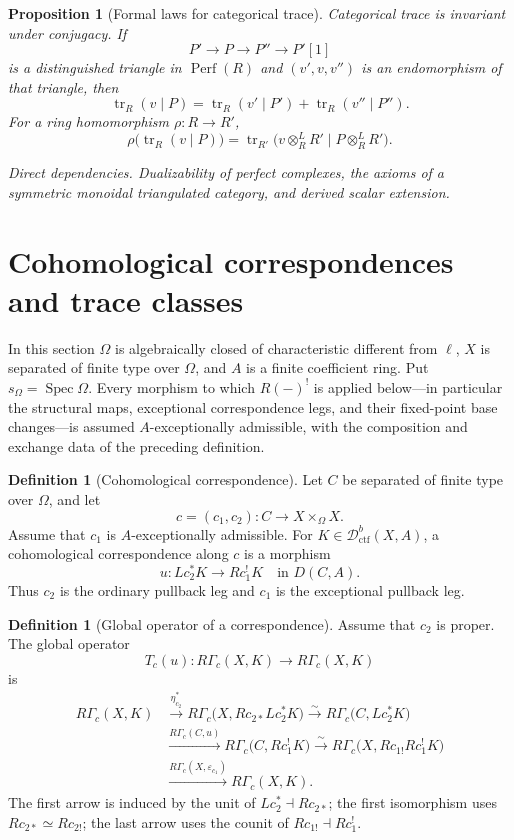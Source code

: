 \documentclass[10pt]{article}
\newtheorem{proposition}[theorem]{Proposition}
\theoremstyle{definition}
\newtheorem{definition}[theorem]{Definition}
\newcommand{\Dctf}{\mathcal D^b_{\mathrm{ctf}}}
\newcommand{\Perf}{\operatorname{Perf}}
\newcommand{\Spec}{\operatorname{Spec}}
\newcommand{\RGammac}{R\Gamma_c}
\newcommand{\depends}[1]{\par\smallskip\noindent\textit{Direct dependencies.} #1\par}
\begin{document}
\begin{proposition}[Formal laws for categorical trace]
Categorical trace is invariant under conjugacy.  If
\[
 P'\to P\to P''\to P'[1]
\]
is a distinguished triangle in \(\Perf(R)\) and
\((v',v,v'')\) is an endomorphism of that triangle, then
\[
 \operatorname{tr}_R(v\mid P)=
 \operatorname{tr}_R(v'\mid P')+
 \operatorname{tr}_R(v''\mid P'').
\]
For a ring homomorphism \(\rho:R\to R'\),
\[
 \rho\bigl(\operatorname{tr}_R(v\mid P)\bigr)=
 \operatorname{tr}_{R'}
 \bigl(v\otimes_R^LR'\mid P\otimes_R^LR'\bigr).
\]
\depends{Dualizability of perfect complexes, the axioms of a symmetric
monoidal triangulated category, and derived scalar extension.}
\end{proposition}

\section{Cohomological correspondences and trace classes}

In this section \(\Omega\) is algebraically closed of characteristic
different from \(\ell\), \(X\) is separated of finite type over
\(\Omega\), and \(A\) is a finite coefficient ring.  Put
\(s_\Omega=\Spec\Omega\).  Every morphism to which \(R(-)^!\) is applied
below---in particular the structural maps, exceptional correspondence legs,
and their fixed-point base changes---is assumed \(A\)-exceptionally
admissible, with the composition and exchange data of the preceding
definition.

\begin{definition}[Cohomological correspondence]
Let \(C\) be separated of finite type over \(\Omega\), and let
\[
 c=(c_1,c_2):C\longrightarrow X\times_\Omega X.
\]
Assume that \(c_1\) is \(A\)-exceptionally admissible.
For \(K\in\Dctf(X,A)\), a cohomological correspondence along \(c\) is a
morphism
\[
 u:Lc_2^*K\longrightarrow Rc_1^!K
 \quad\text{in }D(C,A).
\]
Thus \(c_2\) is the ordinary pullback leg and \(c_1\) is the exceptional
pullback leg.
\end{definition}

\begin{definition}[Global operator of a correspondence]
Assume that \(c_2\) is proper.  The global operator
\[
 T_c(u):\RGammac(X,K)\longrightarrow\RGammac(X,K)
\]
is
\[
\begin{aligned}
\RGammac(X,K)
&\xrightarrow{\eta^*_{c_2}}
\RGammac\bigl(X,Rc_{2*}Lc_2^*K\bigr)
\xrightarrow{\sim}\RGammac\bigl(C,Lc_2^*K\bigr)\\
&\xrightarrow{\RGammac(C,u)}
\RGammac\bigl(C,Rc_1^!K\bigr)
\xrightarrow{\sim}\RGammac\bigl(X,Rc_{1!}Rc_1^!K\bigr)\\
&\xrightarrow{\RGammac(X,\varepsilon_{c_1})}
\RGammac(X,K).
\end{aligned}
\]
The first arrow is induced by the unit of \(Lc_2^*\dashv Rc_{2*}\); the
first isomorphism uses \(Rc_{2*}\simeq Rc_{2!}\); the last arrow uses the
counit of \(Rc_{1!}\dashv Rc_1^!\).
\end{definition}
\end{document}
